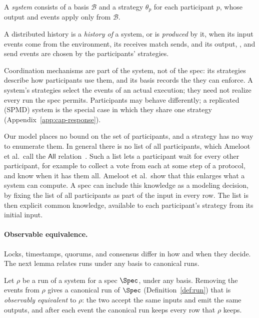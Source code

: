 \begin{definition}[System]
\label{def:system}
A \emph{system} consists of a \commitment basis $\mathcal B$ and a strategy
$\theta_p$ for each participant $p$, whose output and \commitment events apply
only \commitments from $\mathcal B$.
\end{definition}

\begin{definition}
\label{def:produced-history}
A distributed history is a \emph{history of} a system, or is \emph{produced} by
it, when its input events come from the environment, its receives match sends,
and its output, \commitment, and send events are chosen by the participants'
strategies.
\end{definition}

Coordination mechanisms are part of the system, not of the spec: its strategies
describe how participants use them, and its basis records the \commitments they
can enforce.  A system's strategies select the events of an actual execution;
they need not realize every run the spec permits.  Participants may behave
differently; a replicated (SPMD) system is the special case in which they share
one strategy (Appendix~\ref{app:cap-response}).

Our model places no bound on the set of participants, and a strategy has no way
to enumerate them.  In general there is no list of all participants, which
Ameloot et al.\ call the $\mathsf{All}$ relation~\cite{ameloot2013relational}.
Such a list lets a participant wait for every other participant, for example to
collect a vote from each at some step of a protocol, and know when it has them
all.  Ameloot et al.\ show that this enlarges what a system can compute.  A
spec can include this knowledge as a modeling decision, by fixing the list of
all participants as part of the input in every row.  The list is then explicit
common knowledge, available to each participant's strategy from its initial
input.

\paragraph{Observable equivalence.}
Locks, timestamps, quorums, and consensus differ in how and when they decide.
The next lemma relates runs under any basis to canonical runs.

\begin{lemma}
\label{lem:canonical-equivalent}
Let $\rho$ be a run of a system for a spec $\Spec$, under any \commitment
basis.  Removing the \commitment events from $\rho$ gives a canonical run of
$\Spec$ (Definition~\ref{def:run}) that is \emph{observably equivalent} to
$\rho$: the two accept the same inputs and emit the same outputs, and after each
event the canonical run keeps every row that $\rho$ keeps.
\end{lemma}

